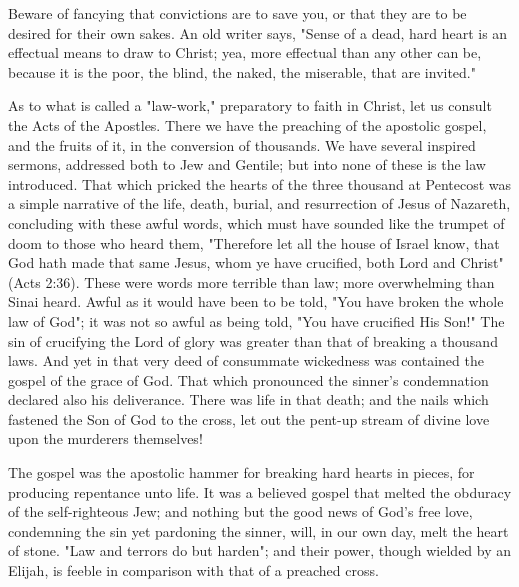 \documentclass[
]{book}
\begin{document}
Beware of fancying that convictions are to save you, or that they are to be desired for their own sakes. An old writer says, "Sense of a dead, hard heart is an effectual means to draw to Christ; yea, more effectual than any other can be, because it is the poor, the blind, the naked, the miserable, that are invited."

As to what is called a "law-work," preparatory to faith in Christ, let us consult the Acts of the Apostles. There we have the preaching of the apostolic gospel, and the fruits of it, in the conversion of thousands. We have several inspired sermons, addressed both to Jew and Gentile; but into none of these is the law introduced. That which pricked the hearts of the three thousand at Pentecost was a simple narrative of the life, death, burial, and resurrection of Jesus of Nazareth, concluding with these awful words, which must have sounded like the trumpet of doom to those who heard them, "Therefore let all the house of Israel know, that God hath made that same Jesus, whom ye have crucified, both Lord and Christ" (Acts 2:36). These were words more terrible than law; more overwhelming than Sinai heard. Awful as it would have been to be told, "You have broken the whole law of God"; it was not so awful as being told, "You have crucified His Son!" The sin of crucifying the Lord of glory was greater than that of breaking a thousand laws. And yet in that very deed of consummate wickedness was contained the gospel of the grace of God. That which pronounced the sinner's condemnation declared also his deliverance. There was life in that death; and the nails which fastened the Son of God to the cross, let out the pent-up stream of divine love upon the murderers themselves!

The gospel was the apostolic hammer for breaking hard hearts in pieces, for producing repentance unto life. It was a believed gospel that melted the obduracy of the self-righteous Jew; and nothing but the good news of God's free love, condemning the sin yet pardoning the sinner, will, in our own day, melt the heart of stone. "Law and terrors do but harden"; and their power, though wielded by an Elijah, is feeble in comparison with that of a preached cross.
\end{document}
